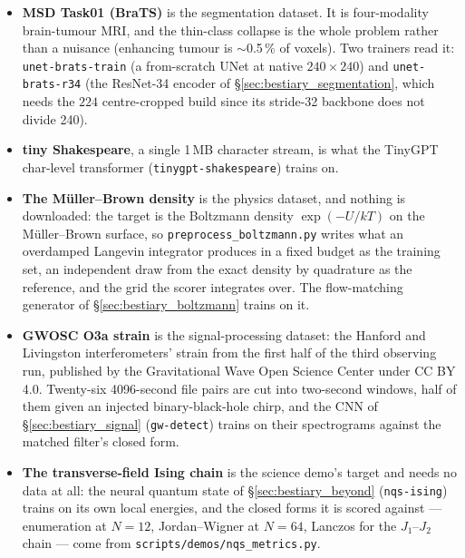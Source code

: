 \begin{itemize}
    $27{,}000$ Sentinel-2 chips over 34 European countries, $64\times64$ at
    10~m in all 13 bands and ten land-cover classes, and $3{,}826$ chips over
    Rond\^onia plus $3{,}620$ over western Bahia in each of two seasons, cut
    from Sentinel-2 scenes of 2023 and labelled from MapBiomas. Chapter~\ref{chap:bn}'s
    CNN (\texttt{rs-bands}) trains on the first under five band subsets and is
    scored on the second, and the demo of \S\ref{sec:bestiary_remote_sensing}
    is what each subset does abroad.
  \item \textbf{MSD Task01 (BraTS)} is the segmentation dataset. It is
    four-modality brain-tumour MRI, and the thin-class collapse is the
    whole problem rather than a nuisance
    (enhancing tumour is $\sim$0.5\,\% of voxels). Two trainers read it:
    \texttt{unet-brats-train} (a from-scratch UNet at native
    $240 \times 240$) and \texttt{unet-brats-r34} (the ResNet-34 encoder of
    \S\ref{sec:bestiary_segmentation}, which needs the $224$ centre-cropped
    build since its stride-32 backbone does not divide 240).
  \item \textbf{tiny Shakespeare}, a single 1\,MB character stream, is what
    the TinyGPT char-level transformer (\texttt{tinygpt-shakespeare})
    trains on.
  \item \textbf{The M\"uller--Brown density} is the physics dataset, and
    nothing is downloaded: the target is the Boltzmann density
    $\exp(-U/kT)$ on the M\"uller--Brown surface, so
    \texttt{preprocess\_boltzmann.py} writes what an overdamped Langevin
    integrator produces in a fixed budget as the training set, an
    independent draw from the exact density by quadrature as the
    reference, and the grid the scorer integrates over. The flow-matching
    generator of \S\ref{sec:bestiary_boltzmann} trains on it.
  \item \textbf{GWOSC O3a strain} is the signal-processing dataset: the
    Hanford and Livingston interferometers' strain from the first half of
    the third observing run, published by the Gravitational Wave Open
    Science Center under CC BY 4.0. Twenty-six 4096-second file pairs are
    cut into two-second windows, half of them given an injected
    binary-black-hole chirp, and the CNN of \S\ref{sec:bestiary_signal}
    (\texttt{gw-detect}) trains on their spectrograms against the matched
    filter's closed form.
  \item \textbf{The transverse-field Ising chain} is the science demo's
    target and needs no data at all: the neural quantum state of
    \S\ref{sec:bestiary_beyond} (\texttt{nqs-ising}) trains on its own
    local energies, and the closed forms it is scored against ---
    enumeration at $N = 12$, Jordan--Wigner at $N = 64$, Lanczos for the
    $J_1$--$J_2$ chain --- come from \texttt{scripts/demos/\allowbreak nqs\_metrics.py}.
\end{itemize}

